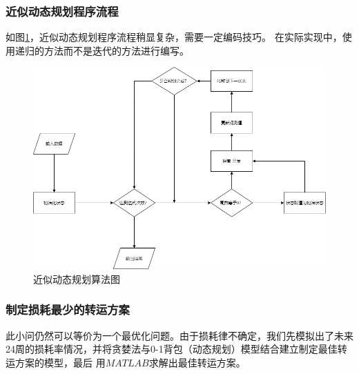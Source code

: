\documentclass{cumcmthesis}
\begin{document}
\subsubsection*{近似动态规划程序流程}
如图\ref{fig:6}，近似动态规划程序流程稍显复杂，需要一定编码技巧。
在实际实现中，使用递归的方法而不是迭代的方法进行编写。
\begin{figure}[htbp]
    \centering
    \includegraphics[scale = 0.5]{guihua.png}
    \centering
    \caption{近似动态规划算法图} \label{fig:6}
\end{figure}


\subsubsection{制定损耗最少的转运方案}
此小问仍然可以等价为一个最优化问题。由于损耗律不确定，我们先模拟出了未来24周的损耗率情况，并将贪婪法与0-1背包（动态规划）模型结合建立制定最佳转运方案的模型，最后
用$MATLAB$求解出最佳转运方案。
\end{document}
